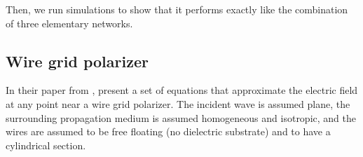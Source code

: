 Then, we run simulations to show that it performs exactly like the combination of three elementary networks.


\subsection{Wire grid polarizer}
In their paper from \citeyear{houde_2001} , \textcite{houde_2001} present a set of equations that approximate the electric field at any point near a wire grid polarizer.
The incident wave is assumed plane, the surrounding propagation medium is assumed homogeneous and isotropic, and the wires are assumed to be free floating (no dielectric substrate) and to have a cylindrical section.

